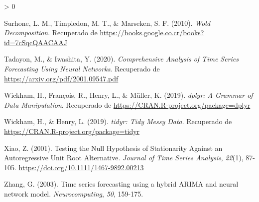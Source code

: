 \documentclass[
]{article}
\newlength{\cslhangindent}
\newenvironment{CSLReferences}[2] %
 {%
  \setlength{\parindent}{0pt}
  \ifodd #1 \everypar{\setlength{\hangindent}{\cslhangindent}}\ignorespaces\fi
  \ifnum #2 > 0
  \setlength{\parskip}{#2\baselineskip}
  \fi
 }%
 {}
\begin{document}
\begin{CSLReferences}{1}{0}
\leavevmode\hypertarget{ref-Wold}{}%
Surhone, L. M., Timpledon, M. T., \& Marseken, S. F. (2010). \emph{Wold
Decomposition}. Recuperado de
\url{https://books.google.co.cr/books?id=7cSqcQAACAAJ}

\leavevmode\hypertarget{ref-redes}{}%
Tadayon, M., \& Iwashita, Y. (2020). \emph{Comprehensive Analysis of
Time Series Forecasting Using Neural Networks}. Recuperado de
\url{https://arxiv.org/pdf/2001.09547.pdf}

\leavevmode\hypertarget{ref-dplyr}{}%
Wickham, H., François, R., Henry, L., \& Müller, K. (2019). \emph{dplyr:
A Grammar of Data Manipulation}. Recuperado de
\url{https://CRAN.R-project.org/package=dplyr}

\leavevmode\hypertarget{ref-tidyr}{}%
Wickham, H., \& Henry, L. (2019). \emph{tidyr: Tidy Messy Data}.
Recuperado de \url{https://CRAN.R-project.org/package=tidyr}

\leavevmode\hypertarget{ref-doi:10.1111ux2f1467-9892.00213}{}%
Xiao, Z. (2001). Testing the Null Hypothesis of Stationarity Against an
Autoregressive Unit Root Alternative. \emph{Journal of Time Series
Analysis}, \emph{22}(1), 87-105.
\url{https://doi.org/10.1111/1467-9892.00213}

\leavevmode\hypertarget{ref-Zhang}{}%
Zhang, G. (2003). Time series forecasting using a hybrid ARIMA and
neural network model. \emph{Neurocomputing}, \emph{50}, 159-175.

\end{CSLReferences}
\end{document}
